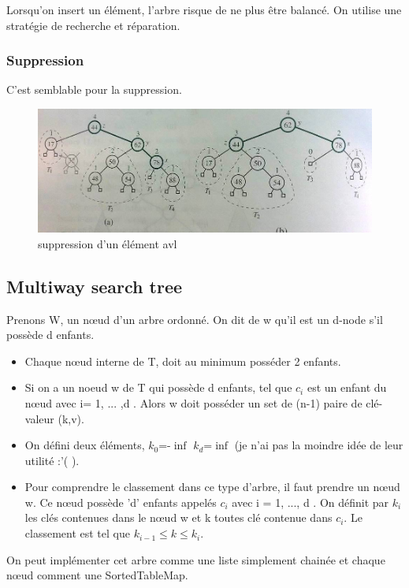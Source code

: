 \documentclass[a4paper]{article}
\begin{document}
Lorsqu'on insert un élément, l'arbre risque de ne plus être balancé. On utilise une stratégie de recherche et réparation.
\subsubsection{Suppression}
C'est semblable pour la suppression.
\begin{figure}[!h]
\begin{center}
\includegraphics[scale=0.4]{suppressionavl.jpg}
\caption{suppression d'un élément avl}
\end{center}
\end{figure}

\subsection{Multiway search tree}
Prenons W, un nœud d'un arbre ordonné. On dit de w qu'il est un d-node s'il possède d enfants. 
\begin{itemize}
\item Chaque nœud interne de T, doit au minimum posséder 2 enfants.

\item Si on a un noeud w de T qui possède d enfants, tel que $c_i$ est un enfant du nœud avec i= 1, ...  ,d . Alors w doit posséder un set de (n-1) paire de clé-valeur (k,v).

\item On défini deux éléments, $k_0$=-$\inf$ $k_d$=$\inf$ (je n'ai pas la moindre idée de leur utilité :'( ). 
\item Pour comprendre le classement dans ce type d'arbre, il faut prendre un nœud w. Ce nœud possède 'd' enfants appelés $c_i$ avec i = 1, ..., d . On définit par $k_i$ les clés contenues dans le nœud w et k toutes clé contenue dans $c_i$. Le classement est tel que $k_{i-1} \leqslant k \leqslant k_i$.
\end{itemize}

On peut implémenter cet arbre comme une liste simplement chainée et chaque nœud comment une SortedTableMap.
\end{document}
